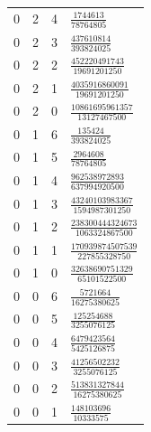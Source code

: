 \begin{longtable}{rrrl}
0 & 2 & 4 & $\frac{1744613}{78764805}$\\
0 & 2 & 3 & $\frac{437610814}{393824025}$\\
0 & 2 & 2 & $\frac{452220491743}{19691201250}$\\
0 & 2 & 1 & $\frac{4035916860091}{19691201250}$\\
0 & 2 & 0 & $\frac{10861695961357}{13127467500}$\\
0 & 1 & 6 & $\frac{135424}{393824025}$\\
0 & 1 & 5 & $\frac{2964608}{78764805}$\\
0 & 1 & 4 & $\frac{962538972893}{637994920500}$\\
0 & 1 & 3 & $\frac{43240103983367}{1594987301250}$\\
0 & 1 & 2 & $\frac{238300444324673}{1063324867500}$\\
0 & 1 & 1 & $\frac{170939874507539}{227855328750}$\\
0 & 1 & 0 & $\frac{32638690751329}{65101522500}$\\
0 & 0 & 6 & $\frac{5721664}{16275380625}$\\
0 & 0 & 5 & $\frac{125254688}{3255076125}$\\
0 & 0 & 4 & $\frac{6479423564}{5425126875}$\\
0 & 0 & 3 & $\frac{41256502232}{3255076125}$\\
0 & 0 & 2 & $\frac{513831327844}{16275380625}$\\
0 & 0 & 1 & $\frac{148103696}{10333575}$\\
\bottomrule
\end{longtable}

